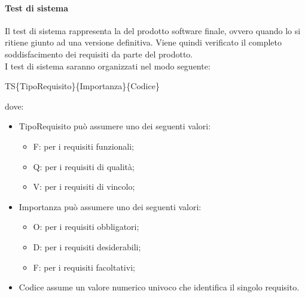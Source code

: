 \paragraph{Test di sistema}
Il test di sistema rappresenta la  del prodotto software finale, ovvero quando lo si
ritiene giunto ad una versione definitiva. Viene quindi verificato il completo soddisfacimento dei
requisiti da parte del prodotto.\\
I test di sistema saranno organizzati nel modo seguente: \\
\begin{center}TS\{TipoRequisito\}\{Importanza\}\{Codice\}\end{center}
dove:
\begin{itemize}
	\item TipoRequisito può assumere uno dei seguenti valori:
	\begin{itemize}
		\item F: per i requisiti funzionali;
		\item Q: per i requisiti di qualità;
		\item V: per i requisiti di vincolo;
	\end{itemize}
	\item Importanza può assumere uno dei seguenti valori:
	\begin{itemize}
		\item O: per i requisiti obbligatori;
		\item D: per i requisiti desiderabili;
		\item F: per i requisiti facoltativi;
	\end{itemize}
	\item Codice assume un valore numerico univoco che identifica il singolo requisito.
\end{itemize}
